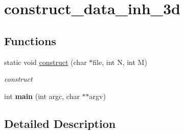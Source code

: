 \hypertarget{group__applications__mri2d__construct__data__inh__3d}{\section{construct\-\_\-data\-\_\-inh\-\_\-3d}
\label{group__applications__mri2d__construct__data__inh__3d}
}
\subsection*{Functions}
\begin{DoxyCompactItemize}
\item 
\hypertarget{group__applications__mri2d__construct__data__inh__3d_ga7cad9b408cf07cdd4fa31da9c325dac5}{static void \hyperlink{group__applications__mri2d__construct__data__inh__3d_ga7cad9b408cf07cdd4fa31da9c325dac5}{construct} (char $\ast$file, int N, int M)}\label{group__applications__mri2d__construct__data__inh__3d_ga7cad9b408cf07cdd4fa31da9c325dac5}

\begin{DoxyCompactList}\small\item\em construct \end{DoxyCompactList}\item 
\hypertarget{group__applications__mri2d__construct__data__inh__3d_ga3c04138a5bfe5d72780bb7e82a18e627}{int {\bfseries main} (int argc, char $\ast$$\ast$argv)}\label{group__applications__mri2d__construct__data__inh__3d_ga3c04138a5bfe5d72780bb7e82a18e627}

\end{DoxyCompactItemize}


\subsection{Detailed Description}
